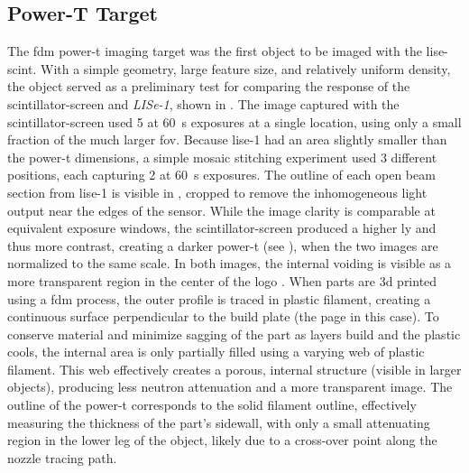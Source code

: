 \documentclass[../../../main.tex]{subfiles}%
\begin{document}
%
    \subsection{Power-T Target}%
    \label{sec:chapter-4:scintillator-single:power-t}%
    The \gls{fdm} \gls{power-t} imaging target was the first object to be imaged with the \gls{lise-scint}.
    With a simple geometry, large feature size, and relatively uniform density, the object served as a preliminary test for comparing the response of the \gls{scintillator-screen} and \textit{LISe-1}, shown in .
    The image captured with the \gls{scintillator-screen} used \SI{5}{\frames} at \SI{60}{\second} exposures at a single location, using only a small fraction of the much larger \gls{fov}.
    Because \gls{lise-1} had an area slightly smaller than the \gls{power-t} dimensions, a simple mosaic stitching experiment used \num{3} different positions, each capturing \SI{2}{\frames} at \SI{60}{\second} exposures.
    The outline of each open beam section from \gls{lise-1} is visible in , cropped to remove the inhomogeneous light output near the edges of the sensor.
    While the image clarity is comparable at equivalent exposure windows, the \gls{scintillator-screen} produced a higher \gls{ly} and thus more contrast, creating a darker \gls{power-t} (see ), when the two images are normalized to the same scale.
    In both images, the internal voiding is visible as a more transparent region in the center of the logo \cite{Lukosi_2016a}.
    When parts are \gls{3d} printed using a \gls{fdm} process, the outer profile is traced in plastic filament, creating a continuous surface perpendicular to the build plate (the page in this case).
    To conserve material and minimize sagging of the part as layers build and the plastic cools, the internal area is only partially filled using a varying web of plastic filament.
    This web effectively creates a porous, internal structure (visible in larger objects), producing less neutron attenuation and a more transparent image.
    The outline of the \gls{power-t} corresponds to the solid filament outline, effectively measuring the thickness of the part's sidewall, with only a small attenuating region in the lower leg of the object, likely due to a cross-over point along the nozzle tracing path.
\end{document}
